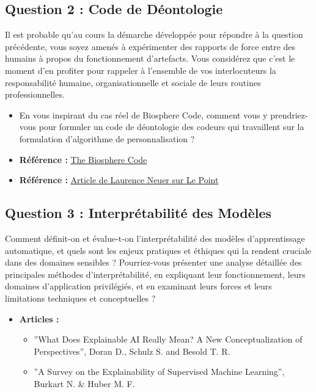 \subsection{Question 2 : Code de Déontologie}
\label{annexe:question2}
Il est probable qu’au cours la démarche développée pour répondre à la question précédente, vous soyez amenés à expérimenter des rapports de force entre des humains à propos du fonctionnement d’artefacts. Vous considérez que c’est le moment d’en profiter pour rappeler à l’ensemble de vos interlocuteurs la responsabilité humaine, organisationnelle et sociale de leurs routines professionnelles.
\begin{itemize}
    \item En vous inspirant du cas réel de Biosphere Code, comment vous y prendriez-vous pour formuler un code de déontologie des codeurs qui travaillent sur la formulation d’algorithme de personnalisation ?
\end{itemize}
\begin{itemize}
    \item \textbf{Référence :} \href{https://darkmachines.earth/blog/the-biospherecode}{The Biosphere Code}
    \item \textbf{Référence :} \href{https://www.lepoint.fr/editos-du-point/laurence-neuer/algorithmes-ce-sont-les-individus-qu-il-faut-responsabiliser-29-01-2018-2190382_56.php#11}{Article de Laurence Neuer sur Le Point}
\end{itemize}

\subsection{Question 3 : Interprétabilité des Modèles}
\label{annexe:question3}
Comment définit-on et évalue-t-on l'interprétabilité des modèles d’apprentissage automatique, et quels sont les enjeux pratiques et éthiques qui la rendent cruciale dans des domaines sensibles ? Pourriez-vous présenter une analyse détaillée des principales méthodes d’interprétabilité, en expliquant leur fonctionnement, leurs domaines d’application privilégiés, et en examinant leurs forces et leurs limitations techniques et conceptuelles ?
\begin{itemize}
    \item \textbf{Articles :}
    \begin{itemize}
        \item ”What Does Explainable AI Really Mean? A New Conceptualization of Perspectives”, Doran D., Schulz S. and Besold T. R.
        \item ”A Survey on the Explainability of Supervised Machine Learning”, Burkart N. \& Huber M. F.
    \end{itemize}
\end{itemize}

